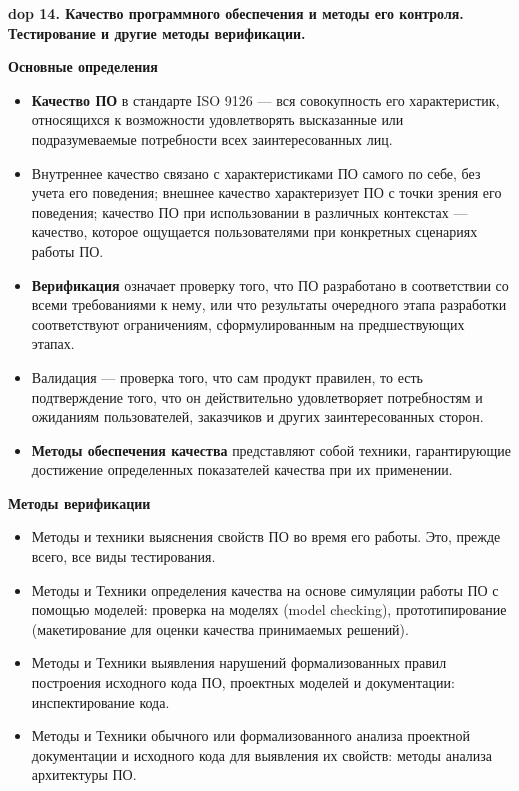 \textbf{\LARGE dop 14. Качество программного обеспечения и методы его контроля. Тестирование и другие методы верификации.}

\textbf{Основные определения}
\begin{itemize}
    \item \textbf{Качество ПО} в стандарте ISO 9126 --- вся совокупность его характеристик, относящихся к возможности удовлетворять высказанные или подразумеваемые потребности всех заинтересованных лиц.
    \item Внутреннее качество связано с характеристиками ПО самого по себе, без учета его поведения; внешнее качество характеризует ПО с точки зрения его поведения; качество ПО при использовании в различных контекстах --- качество, которое ощущается пользователями при конкретных сценариях работы ПО.
    \item \textbf{Верификация} означает проверку того, что ПО разработано в соответствии со всеми требованиями к нему, или что результаты очередного этапа разработки соответствуют ограничениям, сформулированным на предшествующих этапах.
    \item Валидация --- проверка того, что сам продукт правилен, то есть подтверждение того, что он действительно удовлетворяет потребностям и ожиданиям пользователей, заказчиков и других заинтересованных сторон.
    \item \textbf{Методы обеспечения качества} представляют собой техники, гарантирующие достижение определенных показателей качества при их применении.
\end{itemize}

\textbf{Методы верификации}

\begin{itemize}
    \item Методы и техники выяснения свойств ПО во время его работы.
    Это, прежде всего, все виды тестирования.
    \item Методы и Техники определения качества на основе симуляции работы ПО с помощью моделей: проверка на моделях (model checking), прототипирование (макетирование для оценки качества принимаемых решений).
    \item Методы и Техники выявления нарушений формализованных правил построения исходного кода ПО, проектных моделей и документации: инспектирование кода.
    \item Методы и Техники обычного или формализованного анализа проектной документации и исходного кода для выявления их свойств: методы анализа архитектуры ПО.
\end{itemize}

